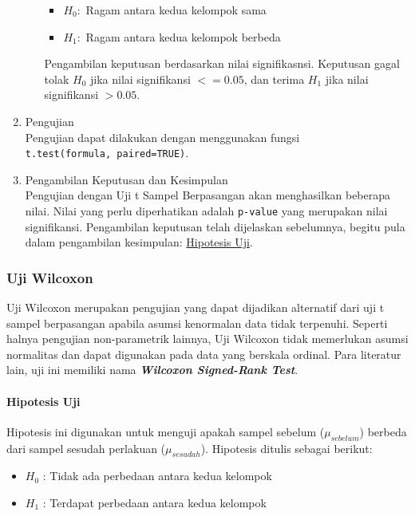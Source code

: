 \documentclass[
]{book}
\providecommand{\tightlist}{%
  \setlength{\itemsep}{0pt}\setlength{\parskip}{0pt}}
\begin{document}
\begin{enumerate}
\begin{itemize}
    \begin{itemize}
    \tightlist
    \item
      \(H_0 :\) Ragam antara kedua kelompok sama
    \item
      \(H_1 :\) Ragam antara kedua kelompok berbeda
    \end{itemize}

    Pengambilan keputusan berdasarkan nilai signifikasnsi. Keputusan gagal tolak \(H_0\) jika nilai signifikansi \(<= 0.05\), dan terima \(H_1\) jika nilai signifikansi \(> 0.05\).
  \end{itemize}
\item
  Pengujian\\
  Pengujian dapat dilakukan dengan menggunakan fungsi \texttt{t.test(formula,\ paired=TRUE)}.
\item
  Pengambilan Keputusan dan Kesimpulan\\
  Pengujian dengan Uji t Sampel Berpasangan akan menghasilkan beberapa nilai. Nilai yang perlu diperhatikan adalah \texttt{p-value} yang merupakan nilai signifikansi. Pengambilan keputusan telah dijelaskan sebelumnya, begitu pula dalam pengambilan kesimpulan: \protect\hyperlink{a3-hipotesis-t-berpasangan}{Hipotesis Uji}.
\end{enumerate}

\hypertarget{uji-wilcoxon}{%
\subsubsection{Uji Wilcoxon}\label{uji-wilcoxon}}

Uji Wilcoxon merupakan pengujian yang dapat dijadikan alternatif dari uji t sampel berpasangan apabila asumsi kenormalan data tidak terpenuhi. Seperti halnya pengujian non-parametrik lainnya, Uji Wilcoxon tidak memerlukan asumsi normalitas dan dapat digunakan pada data yang berskala ordinal. Para literatur lain, uji ini memiliki nama \textbf{\emph{Wilcoxon Signed-Rank Test}}. \citep{allan18}

\hypertarget{a3-hipotesis-w-berpasangan}{%
\paragraph{Hipotesis Uji}\label{a3-hipotesis-w-berpasangan}}

Hipotesis ini digunakan untuk menguji apakah sampel sebelum (\(\mu_{sebelum}\)) berbeda dari sampel sesudah perlakuan (\(\mu_{sesudah}\)). Hipotesis ditulis sebagai berikut:

\begin{itemize}
\tightlist
\item
  \(H_0\) : Tidak ada perbedaan antara kedua kelompok
\item
  \(H_1\) : Terdapat perbedaan antara kedua kelompok
\end{itemize}
\end{document}
